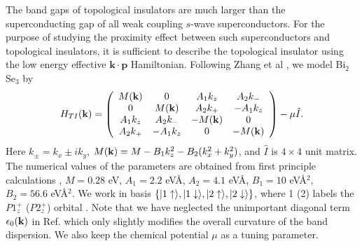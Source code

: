 The band gaps of topological insulators are much larger than the superconducting
gap of all  weak coupling $s$-wave superconductors. 
For the purpose of studying the proximity
effect between such superconductors and topological insulators, it is
sufficient to describe the topological insulator using the 
low energy effective $\mathbf{k}\cdot \mathbf{p}$ Hamiltonian. Following
Zhang et al \cite{zhang}, we model Bi$_2$Se$_3$ by 
\begin{eqnarray}
H_{TI}({\bf k})=
\left( \begin{array}{cccc}
M({\bf k}) & 0 & A_1 k_z  & A_2 k_{-} \\
0 &M({\bf k})& A_2 k_+ & -A_1 k_z \\
 A_1 k_z  & A_2 k_{-} &-M({\bf k}) & 0 \\
A_2 k_+ & -A_1 k_z &0 & -M({\bf k}) \\
 \end{array} \right)-\mu \hat{I}.
 \end{eqnarray}
Here $k_{\pm}=k_x \pm i k_y $, 
$M({\bf k})=M-B_1 k_z ^2 - B_2 (k_x^2 + k_y^2)$, and $\hat{I}$ is $4\times 4$
unit matrix. The numerical values of 
the parameters are obtained from first principle calculations \cite{zhang,band}, $M=0.28$ eV,
$A_1=2.2$ eV\AA, $A_2=4.1$ eV\AA, $B_1=10$ eV\AA$^2$, $B_2=56.6 $ eV\AA$^2$.
We work in basis $\{\vert 1\uparrow \rangle, \vert 1\downarrow \rangle,\vert 2\uparrow \rangle,\vert 2\downarrow \rangle \}$,
where 1 (2) labels the $P1_z^+$ ($P2_z^+$) orbital \cite{zhang}. Note that
we have neglected the unimportant diagonal term $\epsilon_0({\bf k})$ in Ref. \cite{zhang} which 
only slightly modifies the overall curvature of the band dispersion. We also
keep the chemical potential $\mu$ as a tuning parameter.

